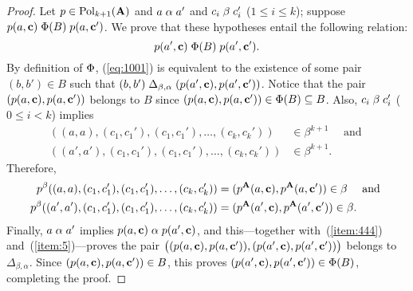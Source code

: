 \begin{proof}
    Let $p \in \operatorname{Pol}_{k+1}(\mathbf{A})$ and $a \mathrel{\alpha} a'$ and $c_i \mathrel{\beta} c_i'$ ($1\leq i\leq k$);
    suppose $p(a, \mathbf{c}) \mathrel{\Phi(B)} p(a, \mathbf{c}')$.
    We prove that these hypotheses entail the following relation:
    \begin{equation}
      \label{eq:1001}
      p(a', \mathbf{c}) \mathrel{\Phi(B)} p(a', \mathbf{c}').
    \end{equation}
    By definition of $\Phi$, (\ref{eq:1001}) 
    is equivalent to the existence of
    some pair $(b,b') \in B$ such that
    $(b,b') \mathrel{\Delta_{\beta, \alpha}} (p(a', \mathbf{c}), p(a', \mathbf{c}'))$.
    Notice that the pair $(p(a, \mathbf{c}), p(a, \mathbf{c}'))$
    belongs to $B$ since
    $(p(a, \mathbf{c}), p(a, \mathbf{c}')) \in \Phi(B) \subseteq B$.  Also,
    $c_i \mathrel{\beta} c_i'$ ($0\leq i<k$) implies
    \begin{align*}
    ((a,a), (c_1, c_1'), (c_1, c_1'), \dots, (c_{k}, c_{k}'))&\in \beta^{k+1} \quad \text{ and }\\
    ((a',a'), (c_1, c_1'), (c_1, c_1'), \dots, (c_{k}, c_{k}')) &\in \beta^{k+1}.
    \end{align*}
    Therefore,
    \begin{align}
      \label{item:444}
    p^{\beta}((a,a), (c_1, c_1'), (c_1, c_1'), \dots, (c_{k}, c_{k}'))
    &= (p^{\mathbf{A}}(a, \mathbf{c}), p^{\mathbf{A}}(a, \mathbf{c}')) \in \beta  \quad \text{ and }\\
    \label{item:5}
    p^{\beta}((a',a'), (c_1, c_1'), (c_1, c_1'), \dots, (c_{k}, c_{k}'))
    &= (p^{\mathbf{A}}(a', \mathbf{c}), p^{\mathbf{A}}(a', \mathbf{c}')) \in \beta.
    \end{align}
    Finally, $a\mathrel{\alpha} a'$ implies $p(a, \mathbf{c}) \mathrel{\alpha} p(a', \mathbf{c})$, and this---together
    with~(\ref{item:444}) and~(\ref{item:5})---proves the pair
    $\bigl((p(a, \mathbf{c}), p(a, \mathbf{c}')), (p(a', \mathbf{c}), p(a', \mathbf{c}'))\bigr)$
    belongs to  $\mathrel{\Delta_{\beta, \alpha}}$.
    Since  $(p(a, \mathbf{c}), p(a, \mathbf{c}')) \in B$, this proves
    $(p(a', \mathbf{c}), p(a', \mathbf{c}')) \in \Phi(B)$, completing the proof.
  \end{proof}

\bigskip


